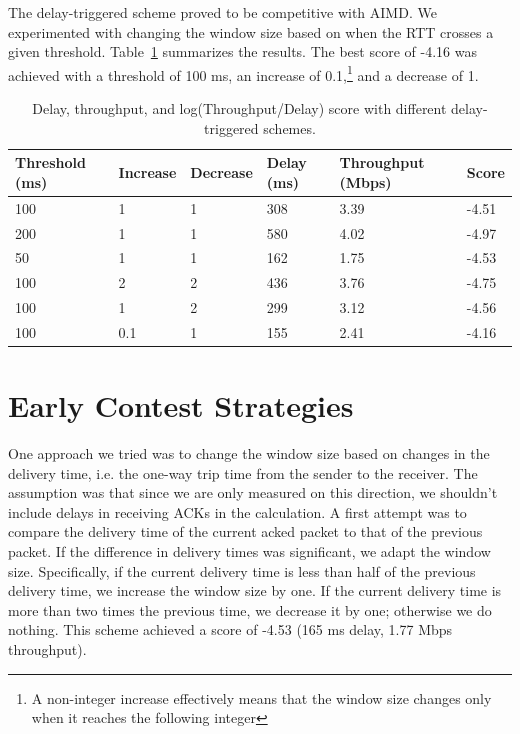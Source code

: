 \documentclass[a4paper,10pt]{article}
\begin{document}
The delay-triggered scheme proved to be competitive with AIMD. We experimented with 
changing the window size based on when the RTT crosses a given threshold. 
Table~\ref{tab:delayTriggered} summarizes the results. The best score of -4.16 was achieved with a threshold 
of 100 ms, an increase of 0.1,\footnote{A non-integer increase effectively means 
that the window size changes only when it reaches the following integer} and a 
decrease of 1.

\begin{table}[h]
 \centering
 \begin{tabular}{|l|l|l|l|p{2cm}|l|}
 \hline
   Threshold (ms) & Increase & Decrease & Delay (ms) & Throughput (Mbps) & Score \\
 \hline
  100 & 1 & 1 & 308 & 3.39 & -4.51 \\
  200 & 1 & 1 & 580 & 4.02 & -4.97 \\
  50  & 1 & 1 & 162 & 1.75 & -4.53 \\
  100 & 2 & 2 & 436 & 3.76 & -4.75 \\
  100 & 1 & 2 & 299 & 3.12 & -4.56 \\
  100 & 0.1 & 1 & 155 & 2.41 & -4.16 \\
  \hline
 \end{tabular}
 \caption{Delay, throughput, and log(Throughput/Delay) score with different 
 delay-triggered schemes.}
 \label{tab:delayTriggered}
\end{table}




\section{Early Contest Strategies}

One approach we tried was to change the window size based on changes in the delivery time, 
i.e. the one-way trip time from the sender to the receiver. The assumption was that since we 
are only measured on this direction, we shouldn't include delays in receiving ACKs in 
the calculation. A first attempt was to compare the delivery time of the current acked
packet to that of the previous packet. If the difference in delivery times was significant, 
we adapt the window size. Specifically, if the current delivery time is less than half
of the previous delivery time, we increase the window size by one. If the current 
delivery time is more than two times the previous time, we decrease it by one; otherwise 
we do nothing. This scheme achieved a score of -4.53 (165 ms delay, 1.77 Mbps throughput). 
\end{document}
